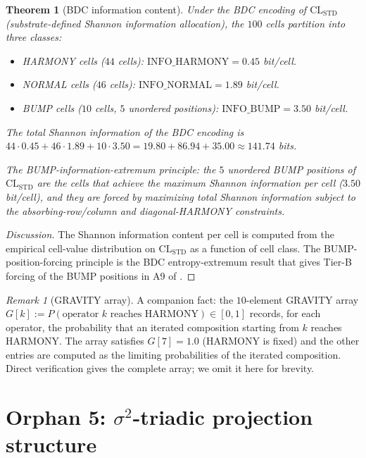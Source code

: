 \documentclass[11pt,reqno]{amsart}
\theoremstyle{plain}
\newtheorem{theorem}{Theorem}[section]
\theoremstyle{definition}
\theoremstyle{remark}
\newtheorem*{remark}{Remark}
\newcommand{\STD}{\mathrm{STD}}
\begin{document}
\begin{theorem}[BDC information content]\label{thm:bdc}
Under the BDC encoding of $\mathrm{CL}_\STD$ (substrate-defined Shannon
information allocation), the $100$ cells partition into three classes:
\begin{itemize}
\item HARMONY cells ($44$ cells): $\mathrm{INFO\_HARMONY} = 0.45$ bit/cell.
\item NORMAL cells ($46$ cells): $\mathrm{INFO\_NORMAL} = 1.89$ bit/cell.
\item BUMP cells ($10$ cells, $5$ unordered positions):
$\mathrm{INFO\_BUMP} = 3.50$ bit/cell.
\end{itemize}
The total Shannon information of the BDC encoding is
$44 \cdot 0.45 + 46 \cdot 1.89 + 10 \cdot 3.50 = 19.80 + 86.94 + 35.00
\approx 141.74$ bits.

The BUMP-information-extremum principle: the $5$ unordered BUMP
positions of $\mathrm{CL}_\STD$ are the cells that achieve the
maximum Shannon information per cell ($3.50$ bit/cell), and they
are forced by maximizing total Shannon information subject to the
absorbing-row/column and diagonal-HARMONY constraints.
\end{theorem}

\begin{proof}[Discussion]
The Shannon information content per cell is computed from the
empirical cell-value distribution on $\mathrm{CL}_\STD$ as a function
of cell class. The BUMP-position-forcing principle is the BDC
entropy-extremum result that gives Tier-B forcing of the BUMP
positions in A9 of \cite{SandersForcing}.
\end{proof}

\begin{remark}[GRAVITY array]
A companion fact: the $10$-element GRAVITY array
$G[k] := P(\text{operator } k \text{ reaches HARMONY}) \in [0, 1]$
records, for each operator, the probability that an iterated
composition starting from $k$ reaches HARMONY. The array satisfies
$G[7] = 1.0$ (HARMONY is fixed) and the other entries are computed
as the limiting probabilities of the iterated composition. Direct
verification gives the complete array; we omit it here for brevity.
\end{remark}

\section{Orphan 5: $\sigma^2$-triadic projection structure}
\label{sec:triadic}
\end{document}
